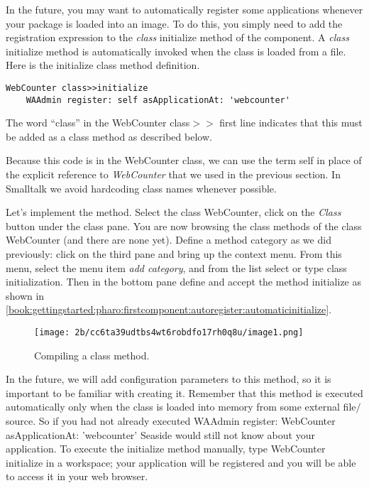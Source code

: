 \documentclass[a4paper,10pt,twoside]{book}
\newcommand{\ct}[1]{{\small\ttfamily\textup{#1}}}
\begin{document}
In the future, you may want to automatically register some applications whenever your package is loaded into an image. To do this, you simply need to add the registration expression to the \textit{class} \ct{initialize} method of the component. A \textit{class} \ct{initialize} method is automatically invoked when the class is loaded from a file. Here is the \ct{initialize} class method definition.

\begin{lstlisting}
WebCounter class>>initialize
    WAAdmin register: self asApplicationAt: 'webcounter'
\end{lstlisting}

The word ``class'' in the \ct{WebCounter class$>$$>$} first line indicates that this must be added as a class method as described below.

Because this code is in the WebCounter class, we can use the term \ct{self} in place of the explicit reference to \textit{WebCounter} that we used in the previous section. In Smalltalk we avoid hardcoding class names whenever possible.

Let's implement the method. Select the class \ct{WebCounter}, click on the \textit{Class} button under the class pane. You are now browsing the class methods of the class \ct{WebCounter} (and there are none yet). Define a method category as we did previously: click on the third pane and bring up the context menu. From this menu, select the menu item \textit{add category}, and from the list select or type \ct{class initialization}. Then in the bottom pane define and accept the method \ct{initialize} as shown in \autoref{book:gettingstarted:pharo:firstcomponent:autoregister:automaticinitialize}.

\begin{figure}[h!tbp]
	\begin{center}
		\texttt{[image: 2b/cc6ta39udtbs4wt6robdfo17rh0q8u/image1.png]}
		\caption{Compiling a class method.\label{book:gettingstarted:pharo:firstcomponent:autoregister:automaticinitialize}}
	\end{center}
\end{figure}


In the future, we will add configuration parameters to this method, so it is important to be familiar with creating it. Remember that this method is executed automatically only when the class is loaded into memory from some external file$/$source. So if you had not already executed \ct{WAAdmin register: WebCounter asApplicationAt: 'webcounter'} Seaside would still not know about your application. To execute the \ct{initialize} method manually, type \ct{WebCounter initialize} in a workspace; your application will be registered and you will be able to access it in your web browser. 
\end{document}

